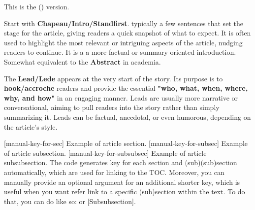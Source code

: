 
This is the \textcolor{wrtxColorWarning}{\textbf{\wrtxLanguageLong} (\wrtxLanguage)} version.\\


Start with \textcolor{wrtxColorSuccess}{\textbf{Chapeau/Intro/Standfirst}}. typically a few sentences that set the stage for the article, giving readers a quick snapshot of what to expect. It is often used to highlight the most relevant or intriguing aspects of the article, nudging readers to continue. It is a  a more factual or summary-oriented introduction. Somewhat equivalent to the \textcolor{wrtxColorSuccess}{\textbf{Abstract}} in academia.


The \textcolor{wrtxColorSuccess}{\textbf{Lead/Lede}} appears at the very start of the story. Its purpose is to \textcolor{wrtxColorSuccess}{\textbf{hook/accroche}} readers and provide the essential \textbf{"who, what, when, where, why, and how"} in an engaging manner. Leads are usually more narrative or conversational, aiming to pull readers into the story rather than simply summarizing it. Leads can be factual, anecdotal, or even humorous, depending on the article's style.


[manual-key-for-sec]
Example of article section.
[manual-key-for-subsec]
Example of article subsection.
[manual-key-for-subsubsec]
Example of article subsubsection.
The code generates key for each section and (sub)(sub)section automatically, which are used for linking to the TOC.
Moreover, you can manually provide an optional argument for an additional shorter key, which is useful when you want refer link to a specific (sub)section within the text. To do that, you can do like so: or [Subsubsection].


